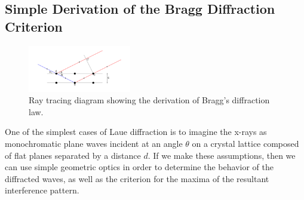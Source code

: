 \documentclass[%
 reprint,
 amsmath,amssymb,
 aps,
 pra,
]{revtex4-1}
\begin{document}
\begin{appendix}

\section{Simple Derivation of the Bragg Diffraction Criterion}\label{section:bragg_derivation}

\begin{figure}[H]
	\centering
	\includegraphics[width=0.4\textwidth]{bragg_derivation.png}
	\caption{Ray tracing diagram showing the derivation of Bragg's diffraction law.}
	\label{fig:bragg_derivation}
\end{figure}

One of the simplest cases of Laue diffraction is to imagine the x-rays as monochromatic plane waves incident at an angle $\theta$ on a crystal lattice composed of flat planes separated by a distance $d$. If we make these assumptions, then we can use simple geometric optics in order to determine the behavior of the diffracted waves, as well as the criterion for the maxima of the resultant interference pattern.


\end{appendix}
\end{document}
